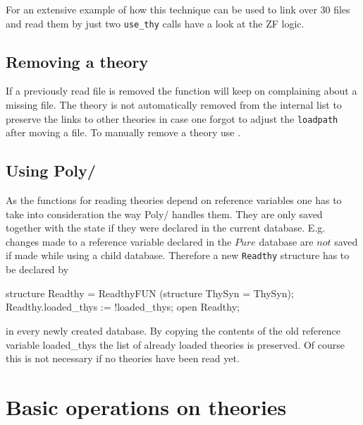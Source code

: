 For an extensive example of how this technique can be used to link over 30
files and read them by just two {\tt use_thy} calls have a look at the ZF
logic.


\subsection{Removing a theory}

If a previously read file is removed the  function will keep
on complaining about a missing file.  The theory is not automatically removed
from the internal list to preserve the links to other theories in case one
forgot to adjust the {\tt loadpath} after moving a file.  To manually remove a
theory use .


\subsection{Using Poly/\ML}

As the functions for reading theories depend on reference variables one has to
take into consideration the way Poly/\ML{} handles them.  They are only saved
together with the state if they were declared in the current database.  E.g.
changes made to a reference variable declared in the $Pure$ database are $not$
saved if made while using a child database.  Therefore a new {\tt Readthy}
structure has to be declared by
\begin{ttbox}
structure Readthy = ReadthyFUN (structure ThySyn = ThySyn);
Readthy.loaded_thys := !loaded_thys;
open Readthy;
\end{ttbox}
in every newly created database.  By copying the contents of the old reference
variable loaded_thys the list of already loaded theories is preserved. Of
course this is not necessary if no theories have been read yet.


\section{Basic operations on theories}
